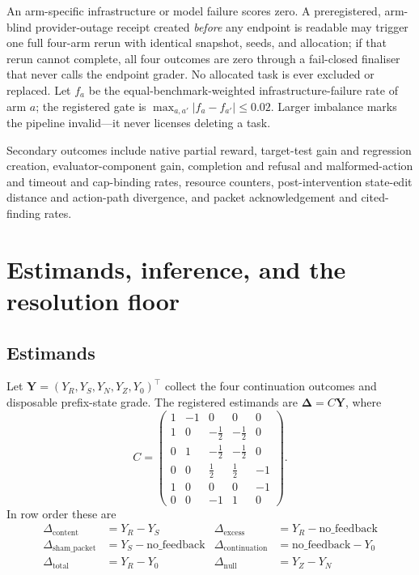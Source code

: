 \documentclass{article}
\begin{document}
An arm-specific infrastructure or model failure scores zero. A preregistered,
arm-blind provider-outage receipt created \emph{before} any endpoint is readable
may trigger one full four-arm rerun with identical snapshot, seeds, and
allocation; if that rerun cannot complete, all four outcomes are zero through a
fail-closed finaliser that never calls the endpoint grader. No allocated task is
ever excluded or replaced. Let $f_a$ be the equal-benchmark-weighted
infrastructure-failure rate of arm $a$; the registered gate is
$\max_{a,a'}|f_a - f_{a'}| \le 0.02$. Larger imbalance marks the pipeline
invalid---it never licenses deleting a task.

Secondary outcomes include native partial reward, target-test gain and
regression creation, evaluator-component gain, completion and refusal and
malformed-action and timeout and cap-binding rates, resource counters,
post-intervention state-edit distance and action-path divergence, and packet
acknowledgement and cited-finding rates.

\section{Estimands, inference, and the resolution floor}
\label{sec:inference}

\subsection{Estimands}

Let $\mathbf Y=(Y_R,Y_S,Y_N,Y_Z,Y_0)^\top$ collect the four continuation
outcomes and disposable prefix-state grade. The registered estimands are
$\boldsymbol\Delta=C\mathbf Y$, where
\[
C=\begin{pmatrix}
1&-1&0&0&0\\
1&0&-\tfrac12&-\tfrac12&0\\
0&1&-\tfrac12&-\tfrac12&0\\
0&0&\tfrac12&\tfrac12&-1\\
1&0&0&0&-1\\
0&0&-1&1&0
\end{pmatrix}.
\]
In row order these are
\begin{align*}
\Delta_{\text{content}} &= Y_R - Y_S
&\Delta_{\text{excess}} &= Y_R - \text{no\_feedback}\\
\Delta_{\text{sham\_packet}} &= Y_S - \text{no\_feedback}
&\Delta_{\text{continuation}} &= \text{no\_feedback} - Y_0\\
\Delta_{\text{total}} &= Y_R - Y_0
&\Delta_{\text{null}} &= Y_Z - Y_N
\end{align*}
\end{document}

